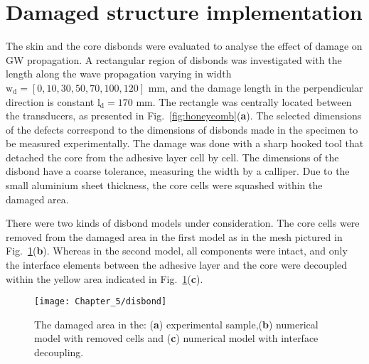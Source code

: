 \section{Damaged structure implementation}
\label{sec:disbond}
The skin and the core disbonds were evaluated to analyse the effect of damage on GW propagation.
A rectangular region of disbonds was investigated with the length along the wave propagation varying in width \(\mathrm{w_d} = [0,10,30,50,70,100,120]\) mm, and the damage length in the perpendicular direction is constant \(\mathrm{l_d} = 170\) mm.
The rectangle was centrally located between the transducers, as presented in Fig.~\ref{fig:honeycomb}(\textbf{a}).
The selected dimensions of the defects correspond to the dimensions of disbonds made in the specimen to be measured experimentally.
The damage was done with a sharp hooked tool that detached the core from the adhesive layer cell by cell.
The dimensions of the disbond have a coarse tolerance, measuring the width by a calliper.
Due to the small aluminium sheet thickness, the core cells were squashed within the damaged area.

There were two kinds of disbond models under consideration.
The core cells were removed from the damaged area in the first model as in the mesh pictured in Fig.~\ref{fig:disbond}(\textbf{b}).
Whereas in the second model, all components were intact, and only the interface elements between the adhesive layer and the core were decoupled within the yellow area indicated in Fig.~\ref{fig:disbond}(\textbf{c}).
\begin{figure}
	\begin{center}
		\texttt{[image: Chapter\_5/disbond]}
	\end{center}
	\caption{The damaged area in the: (\textbf{a}) experimental sample,(\textbf{b}) numerical model with removed cells and (\textbf{c}) numerical model with interface decoupling.}
	\label{fig:disbond}
\end{figure}